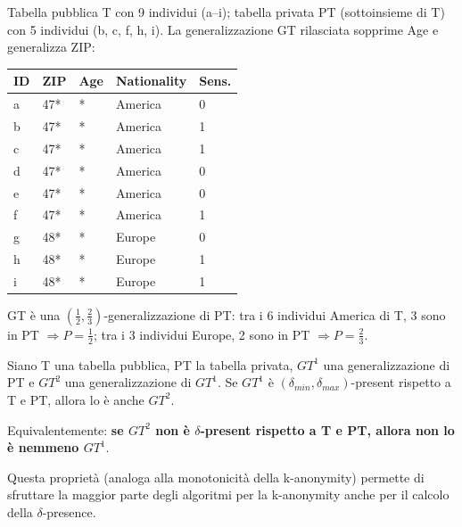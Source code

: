 \documentclass[a4paper,11pt]{article}
\begin{document}
\begin{esempio}
Tabella pubblica T con 9 individui (a--i); tabella privata PT (sottoinsieme di T) con 5 individui (b, c, f, h, i). La generalizzazione GT rilasciata sopprime Age e generalizza ZIP:
\begin{center}
\begin{tabular}{lllll}
\toprule
ID & ZIP & Age & Nationality & Sens. \\
\midrule
a & 47* & * & America & 0 \\
b & 47* & * & America & 1 \\
c & 47* & * & America & 1 \\
d & 47* & * & America & 0 \\
e & 47* & * & America & 0 \\
f & 47* & * & America & 1 \\
g & 48* & * & Europe & 0 \\
h & 48* & * & Europe & 1 \\
i & 48* & * & Europe & 1 \\
\bottomrule
\end{tabular}
\end{center}
GT \`{e} una $\left(\frac{1}{2},\frac{2}{3}\right)$-generalizzazione di PT: tra i 6 individui America di T, 3 sono in PT $\Rightarrow P = \frac{1}{2}$; tra i 3 individui Europe, 2 sono in PT $\Rightarrow P = \frac{2}{3}$.
\end{esempio}

\begin{teorema}
Siano T una tabella pubblica, PT la tabella privata, $GT^1$ una generalizzazione di PT e $GT^2$ una generalizzazione di $GT^1$. Se $GT^1$ \`{e} $(\delta_{min}, \delta_{max})$-present rispetto a T e PT, allora lo \`{e} anche $GT^2$.

Equivalentemente: \textbf{se $GT^2$ non \`{e} $\delta$-present rispetto a T e PT, allora non lo \`{e} nemmeno $GT^1$}.

Questa propriet\`{a} (analoga alla monotonicità della k-anonymity) permette di sfruttare la maggior parte degli algoritmi per la k-anonymity anche per il calcolo della $\delta$-presence.
\end{teorema}
\end{document}
